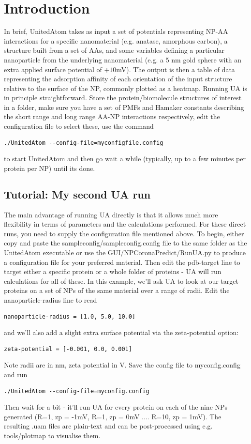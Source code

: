 \documentclass[10pt,a4paper,onecolumn]{report}
\begin{document}
 \section{Introduction}
 In brief, UnitedAtom takes as input a set of potentials representing NP-AA interactions for a specific nanomaterial (e.g. anatase, amorphous carbon), a structure built from a set of AAs, and some variables defining a particular nanoparticle from the underlying nanomaterial (e.g. a 5 nm gold sphere with an extra applied surface potential of $+10$mV). The output is then a table of data representing the adsorption affinity of each orientation of the input structure relative to the surface of the NP, commonly plotted as a heatmap.
  Running UA is in principle straightforward. Store the protein/biomolecule structures of interest in a folder, make sure you have a set of PMFs and Hamaker constants describing the short range and long range AA-NP interactions respectively, edit the configuration file to select these, use the command
\begin{lstlisting}
./UnitedAtom --config-file=myconfigfile.config
\end{lstlisting}
to start UnitedAtom and then go wait a while (typically, up to a few minutes per protein per NP) until its done. 


\subsection{Tutorial: My second UA run} \label{section:uaAdvanced}
The main advantage of running UA directly is that it allows much more flexibility in terms of parameters and the calculations performed. For these direct runs, you need to supply the configuration file mentioned above. 
To begin, either copy and paste the sample\textunderscore config/sample\textunderscore config.config file to the same folder as the UnitedAtom executable or use the GUI/NPCoronaPredict/RunUA.py to produce a configuration file for your preferred material. Then edit the pdb-target line to target either a specific protein or a whole folder of proteins - UA will run calculations for all of these.
In this example, we'll ask UA to look at our target proteins on a set of NPs of the same material over a range of radii. Edit the nanoparticle-radius line to read
\begin{lstlisting}
nanoparticle-radius = [1.0, 5.0, 10.0]
\end{lstlisting}
and we'll also add a slight extra surface potential via the zeta-potential option:
\begin{lstlisting}
zeta-potential = [-0.001, 0.0, 0.001] 
\end{lstlisting}
Note radii are in nm, zeta potential in V. Save the config file to myconfig.config and run
\begin{lstlisting}
./UnitedAtom --config-file=myconfig.config
\end{lstlisting}
Then wait for a bit - it'll run UA for every protein on each of the nine NPs generated (R=1, zp = -1mV, R=1, zp = 0mV .... R=10, zp = 1mV). The resulting .uam files are plain-text and can be post-processed using e.g. tools/plotmap to visualise them.
\end{document}

